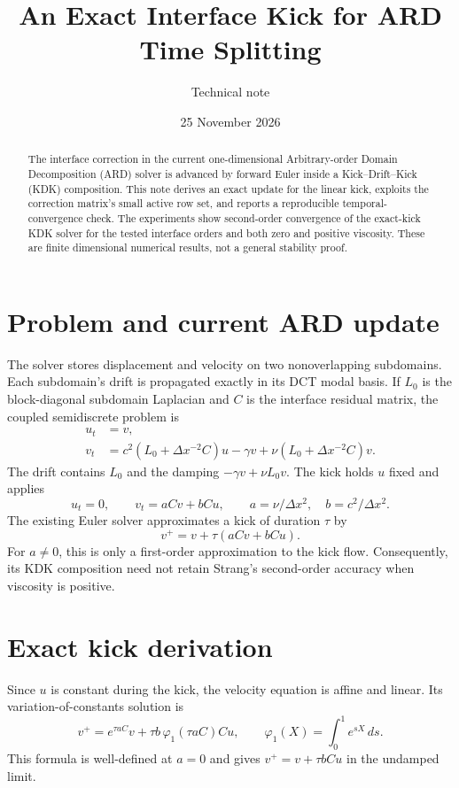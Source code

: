 \documentclass[10pt]{article}
\title{An Exact Interface Kick for ARD Time Splitting}
\author{Technical note}
\date{25 November 2026}
\begin{document}
\maketitle

\begin{abstract}
The interface correction in the current one-dimensional Arbitrary-order
Domain Decomposition (ARD) solver is advanced by forward Euler inside a
Kick--Drift--Kick (KDK) composition. This note derives an exact update for
the linear kick, exploits the correction matrix's small active row set, and
reports a reproducible temporal-convergence check. The experiments show
second-order convergence of the exact-kick KDK solver for the tested
interface orders and both zero and positive viscosity. These are finite
dimensional numerical results, not a general stability proof.
\end{abstract}

\section{Problem and current ARD update}
The solver stores displacement and velocity on two nonoverlapping
subdomains. Each subdomain's drift is propagated exactly in its DCT modal
basis. If $L_0$ is the block-diagonal subdomain Laplacian and $C$ is the
interface residual matrix, the coupled semidiscrete problem is
\begin{align}
  u_t &= v,\\
  v_t &= c^2(L_0+\Delta x^{-2}C)u
       -\gamma v+\nu(L_0+\Delta x^{-2}C)v.
\end{align}
The drift contains $L_0$ and the damping $-\gamma v+\nu L_0v$. The kick
holds $u$ fixed and applies
\begin{equation}
  u_t=0,\qquad v_t=aCv+bCu,\qquad
  a=\nu/\Delta x^2,\quad b=c^2/\Delta x^2.
\end{equation}
The existing Euler solver approximates a kick of duration $\tau$ by
\begin{equation}
  v^+=v+\tau(aCv+bCu).
\end{equation}
For $a\ne0$, this is only a first-order approximation to the kick flow.
Consequently, its KDK composition need not retain Strang's second-order
accuracy when viscosity is positive.

\section{Exact kick derivation}
Since $u$ is constant during the kick, the velocity equation is affine and
linear. Its variation-of-constants solution is
\begin{equation}\label{eq:full}
  v^+=e^{\tau aC}v+\tau b\,\varphi_1(\tau aC)Cu,
  \qquad \varphi_1(X)=\int_0^1 e^{sX}\,ds.
\end{equation}
This formula is well-defined at $a=0$ and gives
$v^+=v+\tau bCu$ in the undamped limit.
\end{document}
